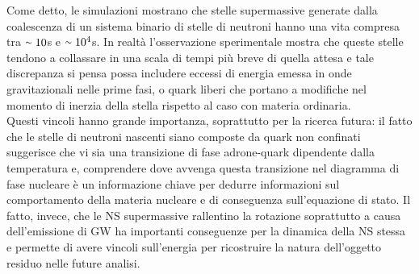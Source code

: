 Come detto, le simulazioni mostrano che stelle supermassive generate dalla coalescenza di un sistema binario di stelle di neutroni hanno una vita compresa tra $\smallsim10$s e $\smallsim10^4$s. In realtà l'osservazione sperimentale mostra che queste stelle tendono a collassare in una scala di tempi più breve di quella attesa e tale discrepanza si pensa possa includere eccessi di energia emessa in onde gravitazionali nelle prime fasi, o quark liberi che portano a modifiche nel momento di inerzia della stella rispetto al caso con materia ordinaria\cite{sarin2020evolution}.\\
Questi vincoli hanno grande importanza, soprattutto per la ricerca futura: il fatto che le stelle di neutroni nascenti siano composte da quark non confinati suggerisce che vi sia una transizione di fase adrone-quark dipendente dalla temperatura e, comprendere dove avvenga questa transizione nel diagramma di fase nucleare è un informazione chiave per dedurre informazioni sul comportamento della materia nucleare e di conseguenza sull'equazione di stato.
Il fatto, invece, che le NS supermassive rallentino la rotazione soprattutto a causa dell'emissione di GW ha importanti conseguenze per la dinamica della NS stessa e permette di avere vincoli sull'energia per ricostruire la natura dell'oggetto residuo nelle future analisi\cite{sarin2020evolution}.

